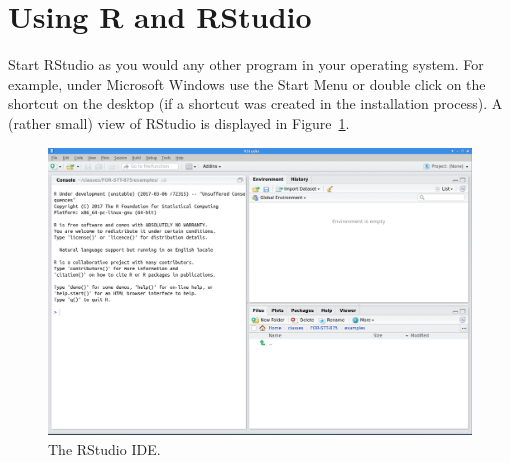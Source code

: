 \documentclass[12pt,oneside]{book}\usepackage[]{graphicx}\usepackage[]{color}
\begin{document}



\section{Using R and RStudio}
Start RStudio as you would any other program in your operating system. For example, under Microsoft Windows use the Start Menu or double click on the shortcut on the desktop (if a shortcut was created in the installation process). A (rather small) view of RStudio is displayed in Figure~\ref{FIG:RSTUDIO}.
\begin{figure}[htbp]
\includegraphics*[width=6.5in]{02-introToR/02-images/RStudio.png}
\caption{The RStudio IDE.}
\label{FIG:RSTUDIO}
\end{figure}
\end{document}
